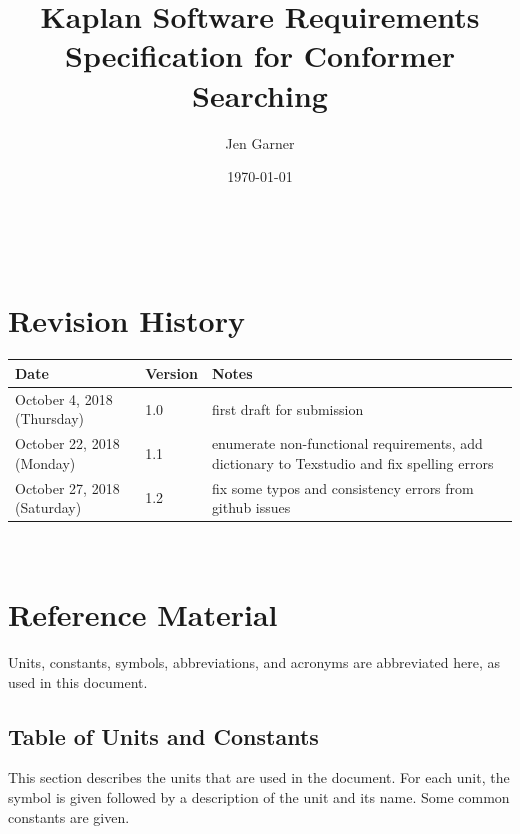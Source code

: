 \documentclass[12pt]{article}
\begin{document}
\title{Kaplan Software Requirements Specification for Conformer Searching} 
\author{Jen Garner}
\date{\today}
	
\maketitle

~\newpage


\section{Revision History}\label{1rev-hist}

\begin{tabularx}{\textwidth}{p{3cm}p{2cm}X}
\toprule {\bf Date} & {\bf Version} & {\bf Notes}\\
\midrule
October 4, 2018 (Thursday) & 1.0 & first draft for 
submission \\
October 22, 2018 (Monday) & 1.1 & enumerate 
non-functional requirements, add dictionary to 
Texstudio and fix spelling errors \\
October 27, 2018 (Saturday) & 1.2 & fix some typos and consistency errors from 
github issues\\
\bottomrule
\end{tabularx}

~\newpage

\section{Reference Material}\label{section-ref-tables}

Units, constants, symbols, abbreviations, and acronyms are abbreviated here, as 
used in this document.

\subsection{Table of Units and Constants}

This section describes the units that are used in the document. For each unit, 
the symbol is given followed by a
description of the unit and its name. Some common constants are given.
~\newline
\end{document}
